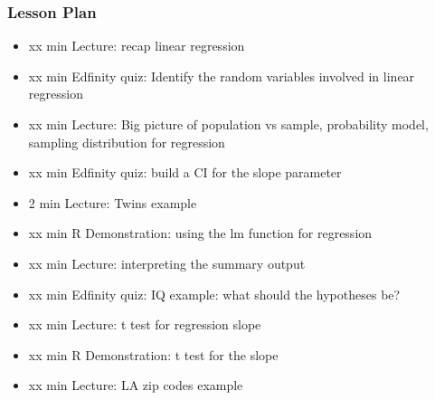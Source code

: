 \begin{frame}
    \frametitle{Lesson Plan}
    \begin{itemize}
        \item xx min Lecture: recap linear regression
        \item xx min Edfinity quiz: Identify the random variables involved in linear regression
        \item xx min Lecture: Big picture of population vs sample, probability model, sampling distribution for regression
        \item xx min Edfinity quiz: build a CI for the slope parameter
        \item 2 min Lecture: Twins example
        \item xx min R Demonstration: using the lm function for regression
        \item xx min Lecture: interpreting the summary output
        \item xx min Edfinity quiz: IQ example: what should the hypotheses be? 
        \item xx min Lecture: t test for regression slope
        \item xx min R Demonstration: t test for the slope
        \item xx min Lecture: LA zip codes example

    \end{itemize}
\end{frame}

    
